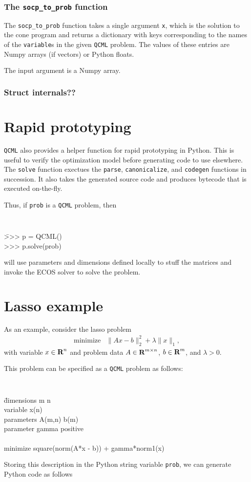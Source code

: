 \documentclass[11pt]{article}
\def\qcml{\texttt{QCML}\xspace}
\newcommand{\reals}{{\mbox{\bf R}}}
\begin{document}
\subsubsection{The {\tt socp\_to\_prob} function}
The {\tt socp\_to\_prob} function takes a single argument {\tt x}, which is
the solution to the cone program and returns a dictionary with keys
corresponding to the names of the {\tt variable}s in the given \qcml problem.
The values of these entries are Numpy arrays (if vectors) or Python floats.

The input argument is a Numpy array.


\subsubsection{Struct internals??}


\section{Rapid prototyping}
\qcml also provides a helper function for rapid prototyping in Python. This
is useful to verify the optimization model before generating code to use
elsewhere. The {\tt solve} function exectues the {\tt parse}, {\tt canonicalize},
and {\tt codegen} functions in succession. It also takes the generated source
code and produces bytecode that is executed on-the-fly.

Thus, if {\tt prob} is a \qcml problem, then
{\tt
\begin{tabbing}
  \qquad \= >>> p = QCML() \\
  \> >>> p.solve(prob)
\end{tabbing}
}
will use parameters and dimensions defined locally to stuff the matrices and
invoke the ECOS solver to solve the problem.

\section{Lasso example}
As an example, consider the lasso problem
\[
\begin{array}{ll}
  \mbox{minimize} & \|Ax - b\|_2^2 + \lambda \|x\|_1,
\end{array}
\]
with variable $x \in \reals^n$ and problem data $A\in\reals^{m\times n}$, 
$b \in \reals^m$, and $\lambda > 0$.

This problem can be specified as a \qcml problem as follows:
{\tt
\begin{tabbing}
\qquad 
\= dimensions m n \\
\> variable x(n) \\
\> parameters A(m,n) b(m)\\ 
\> parameter gamma positive\\
\\
\> minimize square(norm(A*x - b)) + gamma*norm1(x)
\end{tabbing}
}
\noindent Storing this description in the Python string variable {\tt prob},
we can generate Python code as follows
\end{document}
